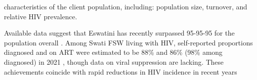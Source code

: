characteristics of the client population, including:
population size, turnover, and relative HIV prevalence. %
\par
Available data suggest that
Eswatini has recently surpassed 95-95-95 for the population overall \cite{SHIMS3}.
Among Swati FSW living with HIV, self-reported proportions diagnosed and on ART
were estimated to be 88\% and 86\% (98\% among diagnosed) in 2021 \cite{EswIBBS2022},
though data on viral suppression are lacking.
These achievements coincide with rapid reductions in HIV incidence in recent years
